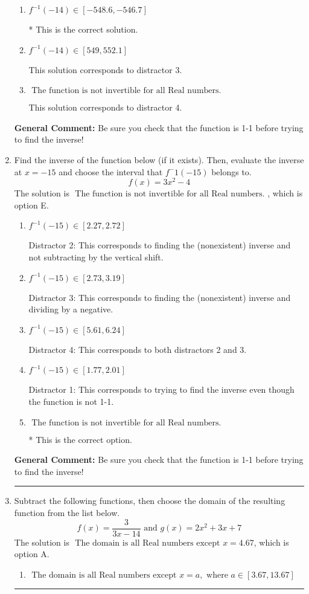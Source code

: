 \documentclass{extbook}[14pt]
\newcommand{\litem}[1]{\item #1

\rule{\textwidth}{0.4pt}}
\begin{document}
\begin{enumerate}
{\begin{enumerate}[label=\Alph*.]
 Distractor 1: This corresponds to 
\item \( f^{-1}(-14) \in [-548.6, -546.7] \)

* This is the correct solution.
\item \( f^{-1}(-14) \in [549, 552.1] \)

 This solution corresponds to distractor 3.
\item \( \text{ The function is not invertible for all Real numbers. } \)

 This solution corresponds to distractor 4.
\end{enumerate}

\textbf{General Comment:} Be sure you check that the function is 1-1 before trying to find the inverse!
}
\litem{
Find the inverse of the function below (if it exists). Then, evaluate the inverse at $x = -15$ and choose the interval that $f^-1(-15)$ belongs to.
\[ f(x) = 3 x^2 - 4 \]The solution is \( \text{ The function is not invertible for all Real numbers. } \), which is option E.\begin{enumerate}[label=\Alph*.]
\item \( f^{-1}(-15) \in [2.27, 2.72] \)

 Distractor 2: This corresponds to finding the (nonexistent) inverse and not subtracting by the vertical shift.
\item \( f^{-1}(-15) \in [2.73, 3.19] \)

 Distractor 3: This corresponds to finding the (nonexistent) inverse and dividing by a negative.
\item \( f^{-1}(-15) \in [5.61, 6.24] \)

 Distractor 4: This corresponds to both distractors 2 and 3.
\item \( f^{-1}(-15) \in [1.77, 2.01] \)

 Distractor 1: This corresponds to trying to find the inverse even though the function is not 1-1. 
\item \( \text{ The function is not invertible for all Real numbers. } \)

* This is the correct option.
\end{enumerate}

\textbf{General Comment:} Be sure you check that the function is 1-1 before trying to find the inverse!
}
\litem{
Subtract the following functions, then choose the domain of the resulting function from the list below.
\[ f(x) = \frac{3}{3x-14} \text{ and } g(x) = 2x^{2} +3 x + 7 \]The solution is \( \text{ The domain is all Real numbers except } x = 4.67 \), which is option A.\begin{enumerate}[label=\Alph*.]
\item \( \text{ The domain is all Real numbers except } x = a, \text{ where } a \in [3.67, 13.67] \)



\end{enumerate}}
\end{enumerate}
\end{document}
